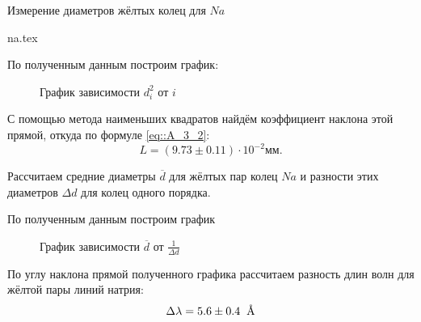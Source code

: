 \begin{table}[h]
  \caption{Измерение диаметров жёлтых колец для $Na$}
  \begin{center}
    {na.tex}
  \end{center}
\end{table}
По полученным данным построим график:

\begin{figure}[h!]
  \caption{График зависимости $d_i^2$ от $i$}
  \label{img::gr_1}
\end{figure}

С помощью метода наименьших квадратов найдём коэффициент наклона этой 
прямой, откуда по формуле \eqref{eq::A_3_2}:
$$
L = (9.73 \pm 0.11) \cdot 10^{-2} мм.
$$

Рассчитаем средние диаметры $\overline{d}$ для жёлтых пар колец
$Na$ и разности этих диаметров $\Delta d$ для колец одного порядка.

\begin{table}[h]
  \caption{К рассчёту $\overline{d}$ и $\frac{1}{\Delta d}$}
\end{table}

По полученным данным построим график 
\begin{figure}[h]
  \caption{График зависимости $\overline{d}$ от $\frac{1}{\Delta d}$}
\end{figure}

По углу наклона прямой полученного графика рассчитаем разность
длин волн для жёлтой пары линий натрия:
$$
\Delta \lambda = 5.6 \pm 0.4 \text{\: \AA}
$$

